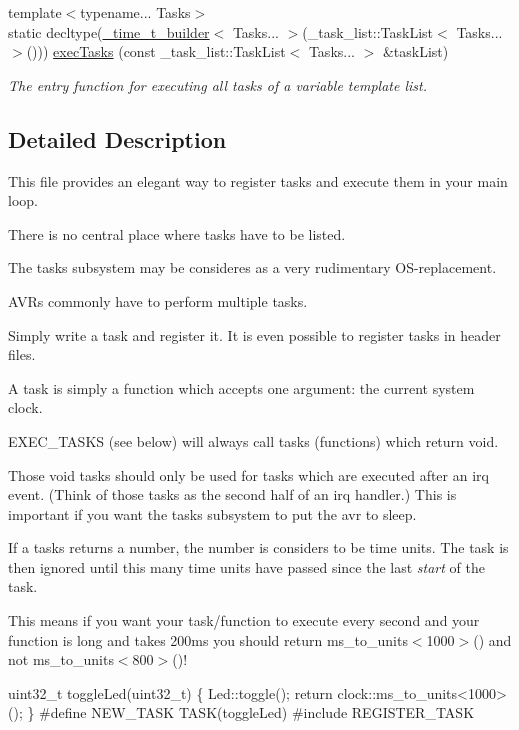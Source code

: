 \begin{DoxyCompactItemize}
{\footnotesize template$<$typename... Tasks$>$ }\\static decltype(\hyperlink{namespacetasks_a9469b8fb917e0f3ec0168293ac046a4c}{\+\_\+time\+\_\+t\+\_\+builder}$<$ Tasks... $>$(\+\_\+task\+\_\+list\+::\+Task\+List$<$ Tasks... $>$())) \hyperlink{namespacetasks_a6590d6a524b4aedb5d0dfef5e1b61bc1}{exec\+Tasks} (const \+\_\+task\+\_\+list\+::\+Task\+List$<$ Tasks... $>$ \&task\+List)
\begin{DoxyCompactList}\small\item\em The entry function for executing all tasks of a variable template list. \end{DoxyCompactList}\end{DoxyCompactItemize}


\subsection{Detailed Description}
This file provides an elegant way to register tasks and execute them in your main loop. 

There is no central place where tasks have to be listed.

The tasks subsystem may be consideres as a very rudimentary O\+S-\/replacement.

A\+V\+Rs commonly have to perform multiple tasks.

Simply write a task and register it. It is even possible to register tasks in header files.

A task is simply a function which accepts one argument\+: the current system clock.

E\+X\+E\+C\+\_\+\+T\+A\+S\+KS (see below) will always call tasks (functions) which return void.

Those void tasks should only be used for tasks which are executed after an irq event. (Think of those tasks as the second half of an irq handler.) This is important if you want the tasks subsystem to put the avr to sleep.

If a tasks returns a number, the number is considers to be time units. The task is then ignored until this many time units have passed since the last {\itshape start} of the task.

This means if you want your task/function to execute every second and your function is long and takes 200ms you should return ms\+\_\+to\+\_\+units$<$1000$>$() and not ms\+\_\+to\+\_\+units$<$800$>$()!


\begin{DoxyCode}
uint32\_t toggleLed(uint32\_t) \{
  Led::toggle();
  \textcolor{keywordflow}{return} clock::ms\_to\_units<1000>();
\}
\textcolor{preprocessor}{#define NEW\_TASK TASK(toggleLed)}
\textcolor{preprocessor}{#include REGISTER\_TASK}
\end{DoxyCode}


